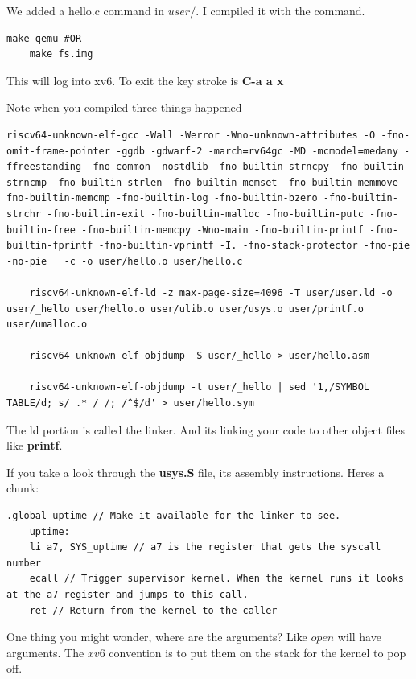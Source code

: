 \documentclass[11pt]{article}
\begin{document}
We added a hello.c command in $user/$. I compiled it with the command.

\begin{lstlisting}[style=bashstyle]
	make qemu #OR
	make fs.img
\end{lstlisting}


This will log into xv6. To exit the key stroke is \textbf{C-a a x}

Note when you compiled three things happened
\begin{lstlisting}[style=bashstyle]
	riscv64-unknown-elf-gcc -Wall -Werror -Wno-unknown-attributes -O -fno-omit-frame-pointer -ggdb -gdwarf-2 -march=rv64gc -MD -mcmodel=medany -ffreestanding -fno-common -nostdlib -fno-builtin-strncpy -fno-builtin-strncmp -fno-builtin-strlen -fno-builtin-memset -fno-builtin-memmove -fno-builtin-memcmp -fno-builtin-log -fno-builtin-bzero -fno-builtin-strchr -fno-builtin-exit -fno-builtin-malloc -fno-builtin-putc -fno-builtin-free -fno-builtin-memcpy -Wno-main -fno-builtin-printf -fno-builtin-fprintf -fno-builtin-vprintf -I. -fno-stack-protector -fno-pie -no-pie   -c -o user/hello.o user/hello.c
	
	riscv64-unknown-elf-ld -z max-page-size=4096 -T user/user.ld -o user/_hello user/hello.o user/ulib.o user/usys.o user/printf.o user/umalloc.o

	riscv64-unknown-elf-objdump -S user/_hello > user/hello.asm

	riscv64-unknown-elf-objdump -t user/_hello | sed '1,/SYMBOL TABLE/d; s/ .* / /; /^$/d' > user/hello.sym
\end{lstlisting}

The ld portion is called the linker. And its linking your code to other object files like \textbf{printf}.

If you take a look through the \textbf{usys.S} file, its assembly instructions. Heres a chunk:
\begin{lstlisting}[style=asmstyle]
	.global uptime // Make it available for the linker to see.
	uptime: 
 	li a7, SYS_uptime // a7 is the register that gets the syscall number
 	ecall // Trigger supervisor kernel. When the kernel runs it looks at the a7 register and jumps to this call.
 	ret // Return from the kernel to the caller
\end{lstlisting}

One thing you might wonder, where are the arguments? Like $open$ will have arguments. The $xv6$ convention is to put them on the stack for the kernel to pop off. 

\printbibliography
\end{document}
